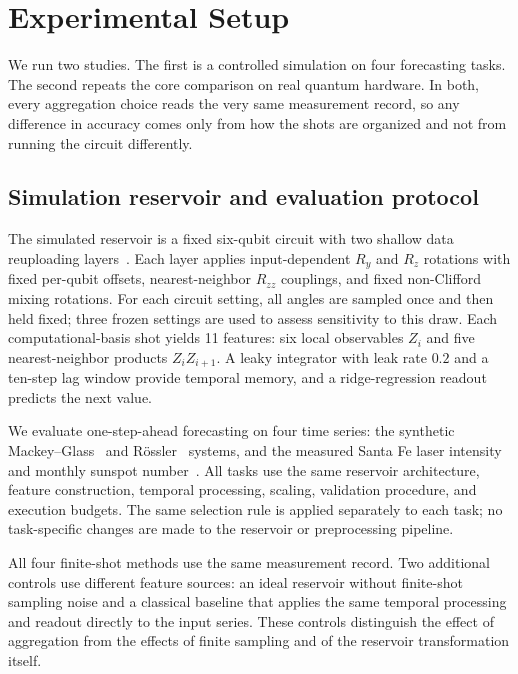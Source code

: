 \section{Experimental Setup}
\label{sec:setup}

We run two studies. The first is a controlled simulation on four forecasting
tasks. The second repeats the core comparison on real quantum hardware. In both,
every aggregation choice reads the very same measurement record, so any
difference in accuracy comes only from how the shots are organized and not from
running the circuit differently.

\subsection{Simulation reservoir and evaluation protocol}

The simulated reservoir is a fixed six-qubit circuit with two shallow data
reuploading layers~\cite{perezsalinas2020data}. Each layer applies
input-dependent $R_y$ and $R_z$ rotations with fixed per-qubit offsets,
nearest-neighbor $R_{zz}$ couplings, and fixed non-Clifford mixing rotations.
For each circuit setting, all angles are sampled once and then held fixed;
three frozen settings are used to assess sensitivity to this draw. Each
computational-basis shot yields 11 features: six local observables $Z_i$ and
five nearest-neighbor products $Z_iZ_{i+1}$. A leaky integrator with leak rate
$0.2$ and a ten-step lag window provide temporal memory, and a ridge-regression
readout predicts the next value.

We evaluate one-step-ahead forecasting on four time series: the synthetic
Mackey--Glass~\cite{mackey1977oscillation} and
R\"ossler~\cite{rossler1976equation} systems, and the measured Santa Fe laser
intensity~\cite{gershenfeld1993future} and monthly sunspot
number~\cite{sidc2026sunspots}. All tasks use the same reservoir architecture,
feature construction, temporal processing, scaling, validation procedure, and
execution budgets. The same selection rule is applied separately to each task;
no task-specific changes are made to the reservoir or preprocessing pipeline.

All four finite-shot methods use the same measurement record. Two additional
controls use different feature sources: an ideal reservoir without
finite-shot sampling noise and a classical baseline that applies the same
temporal processing and readout directly to the input series. These controls
distinguish the effect of aggregation from the effects of finite sampling and
of the reservoir transformation itself.

